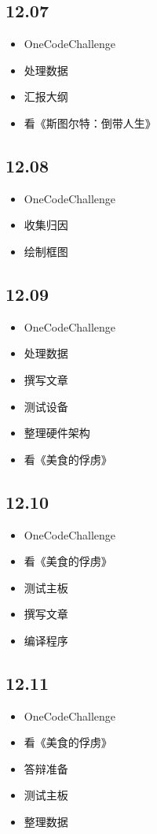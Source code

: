 \documentclass[UTF8]{ctexart}
\begin{document}
\subsection*{12.07}
\begin{itemize}
    \item OneCodeChallenge
    \item 处理数据
    \item 汇报大纲
    \item 看《斯图尔特：倒带人生》
\end{itemize}

\subsection*{12.08}
\begin{itemize}
    \item OneCodeChallenge
    \item 收集归因
    \item 绘制框图
\end{itemize}

\subsection*{12.09}
\begin{itemize}
    \item OneCodeChallenge
    \item 处理数据
    \item 撰写文章
    \item 测试设备
    \item 整理硬件架构
    \item 看《美食的俘虏》
\end{itemize}

\subsection*{12.10}
\begin{itemize}
    \item OneCodeChallenge
    \item 看《美食的俘虏》
    \item 测试主板
    \item 撰写文章
    \item 编译程序
\end{itemize}

\subsection*{12.11}
\begin{itemize}
    \item OneCodeChallenge
    \item 看《美食的俘虏》
    \item 答辩准备
    \item 测试主板
    \item 整理数据
\end{itemize}
\end{document}
